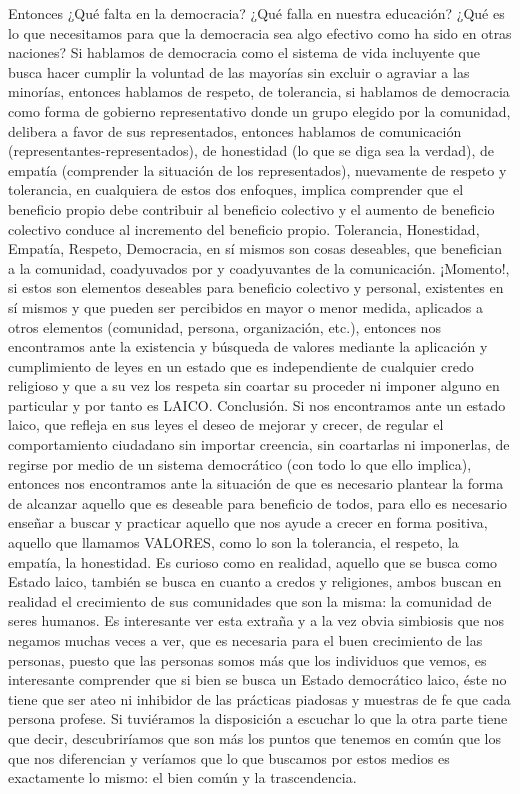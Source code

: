 Entonces ¿Qué falta en la democracia? ¿Qué falla en nuestra educación? ¿Qué es lo que necesitamos para que la democracia sea algo efectivo como ha sido en otras naciones? Si hablamos de democracia como el sistema de vida incluyente que busca hacer cumplir la voluntad de las mayorías sin excluir o agraviar a las minorías, entonces hablamos de respeto, de tolerancia, si hablamos de democracia como forma de gobierno representativo donde un grupo elegido por la comunidad, delibera a favor de sus representados, entonces hablamos de comunicación (representantes-representados), de honestidad (lo que se diga sea la verdad), de empatía (comprender la situación de los representados), nuevamente de respeto y tolerancia, en cualquiera de estos dos enfoques, implica comprender que el beneficio propio debe contribuir al beneficio colectivo y el aumento de beneficio colectivo conduce al incremento del beneficio propio.
Tolerancia, Honestidad, Empatía, Respeto, Democracia, en sí mismos son cosas deseables, que benefician a la comunidad, coadyuvados por y coadyuvantes de la comunicación. ¡Momento!, si estos son elementos deseables para beneficio colectivo y personal, existentes en sí mismos y que pueden ser percibidos en mayor o menor medida, aplicados a otros elementos (comunidad, persona, organización, etc.), entonces nos encontramos ante la existencia y búsqueda de valores mediante la aplicación y cumplimiento de leyes en un estado que es independiente de cualquier credo religioso y que a su vez los respeta sin coartar su proceder ni imponer alguno en particular y por tanto es LAICO.
Conclusión.
Si nos encontramos ante un estado laico, que refleja en sus leyes el deseo de mejorar y crecer, de regular el comportamiento ciudadano sin importar creencia, sin coartarlas ni imponerlas, de regirse por medio de un sistema democrático (con todo lo que ello implica), entonces nos encontramos ante la situación de que es necesario plantear la forma de alcanzar aquello que es deseable para beneficio de todos, para ello es necesario enseñar a buscar y practicar aquello que nos ayude a crecer en forma positiva, aquello que llamamos VALORES, como lo son la tolerancia, el respeto, la empatía, la honestidad. Es curioso como en realidad, aquello que se busca como Estado laico, también se busca en cuanto a credos y religiones, ambos buscan en realidad el crecimiento de sus comunidades que son la misma: la comunidad de seres humanos. Es interesante ver esta extraña y a la vez obvia simbiosis que nos negamos muchas veces a ver, que es necesaria para el buen crecimiento de las personas, puesto que las personas somos más que los individuos que vemos, es interesante comprender que si bien se busca un Estado democrático laico, éste no tiene que ser ateo ni inhibidor de las prácticas piadosas y muestras de fe que cada persona profese. Si tuviéramos la disposición a escuchar lo que la otra parte tiene que decir, descubriríamos que son más los puntos que tenemos en común que los que nos diferencian y veríamos que lo que buscamos por estos medios es exactamente lo mismo: el bien común y la trascendencia.
